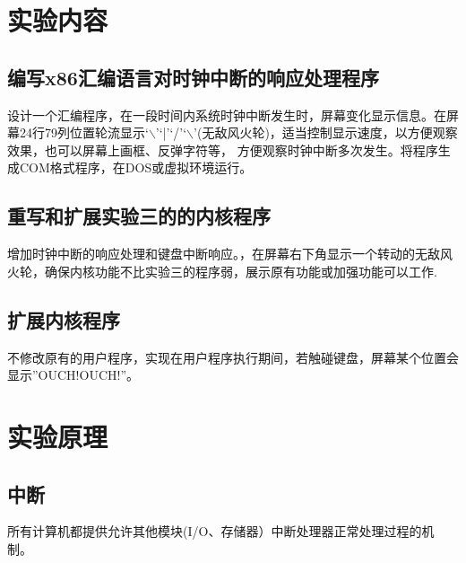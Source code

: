 \documentclass[a4paper, 11pt]{article} %
\begin{document}
\section{实验内容}

\subsection{编写x86汇编语言对时钟中断的响应处理程序}

设计一个汇编程序，在一段时间内系统时钟中断发生时，屏幕变化显示信息。在屏幕24行79列位置轮流显示`$\backslash$'`|'`/'`$\backslash$'(无敌风火轮)，适当控制显示速度，以方便观察效果，也可以屏幕上画框、反弹字符等，
方便观察时钟中断多次发生。将程序生成COM格式程序，在DOS或虚拟环境运行。

\subsection{重写和扩展实验三的的内核程序}

增加时钟中断的响应处理和键盘中断响应。，在屏幕右下角显示一个转动的无敌风火轮，确保内核功能不比实验三的程序弱，展示原有功能或加强功能可以工作.
\subsection{扩展内核程序}

不修改原有的用户程序，实现在用户程序执行期间，若触碰键盘，屏幕某个位置会显示”OUCH!OUCH!”。

\section{实验原理}
\subsection{中断}
所有计算机都提供允许其他模块(I/O、存储器）中断处理器正常处理过程的机制。
\end{document}
